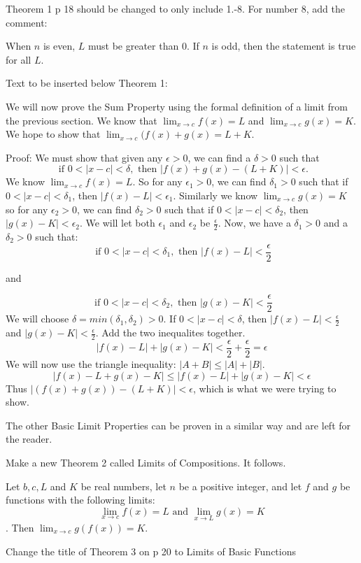 \documentclass[10pt]{article}
\newcommand{\ds}{\displaystyle}
\begin{document}
Theorem 1  p 18 should be changed to only include 1.-8. For number 8, add the comment:  

When $n$ is even, $L$ must be greater than 0. If $n$ is odd, then the statement is true for all $L$.

Text to be inserted below Theorem 1:

We will now prove the Sum Property using the formal definition of a limit from the previous section. We know that $\ds \lim_{x\to c}f(x) = L$ and  $\lim_{x\to c} g(x) = K$. We hope to show that $\ds \lim_{x\to c} (f(x)+g(x)=L+K$.

Proof: We must show that given any $\epsilon>0$, we can find a $\delta>0$ such that $$\text{\ if\ }  0<|x-c|<\delta, \text{\ then\ } |f(x)+g(x)-(L+K)|<\epsilon.$$  We know $\ds \lim_{x\to c}f(x) = L$. So for any $\epsilon_1 >0$, we can find $\delta_1>0$ such that if $0<|x-c|<\delta_1$, then $|f(x)-L|<\epsilon_1$. Similarly we know $\lim_{x\to c} g(x) = K$ so for any $\epsilon_2>0$, we can find $\delta_2>0$ such that if  $0<|x-c|<\delta_2$, then $|g(x)-K|<\epsilon_2$. We will let both $\epsilon_1$ and $\epsilon_2$ be $\frac{\epsilon}{2}$. Now, we have a $\delta_1>0$ and a $\delta_2>0$ such that: \small $$\text{\ if\ }  0<|x-c|<\delta_1, \text{\ then\ } |f(x)-L|<\frac{\epsilon}{2}$$
\begin{center} and \end{center} 
$$\text{\ if\ }  0<|x-c|<\delta_2, \text{\ then\ } |g(x)-K|<\frac{\epsilon}{2}$$
\normalsize
We will choose $\delta=min(\delta_1,\delta_2)>0$. If $0<|x-c|<\delta$, then $|f(x)-L|<\frac{\epsilon}{2}$ and  $|g(x)-K|<\frac{\epsilon}{2}$.  Add the two inequalites together.  $$|f(x)-L|+|g(x)-K|<\frac{\epsilon}{2}+\frac{\epsilon}{2}=\epsilon$$
We will now use the triangle inequality: $|A+B|\leq |A|+|B|$.
$$|f(x)-L+g(x)-K|\leq |f(x)-L|+|g(x)-K|<\epsilon$$
Thus $|(f(x)+g(x))-(L+K)|<\epsilon$, which is what we were trying to show.

The other Basic Limit Properties can be proven in a similar way and are left for the reader.

Make a new Theorem 2 called Limits of Compositions. It follows.

Let $b, c, L$ and $K$ be real numbers, let $n$ be a positive integer, and let $f$ and $g$ be functions with the following limits: 
$$\lim_{x\to c}f(x) = L \text{\ and\ } \lim_{x\to L} g(x) = K$$. Then $\ds \lim_{x\to c} g(f(x))=K.$


Change the title of Theorem 3 on p 20 to Limits of Basic Functions
\end{document}
